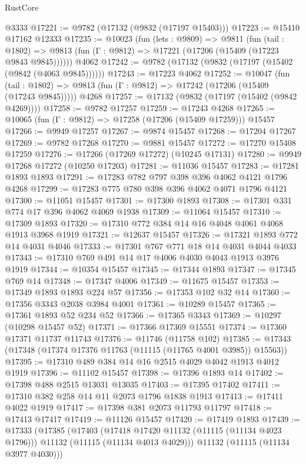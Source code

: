 \begin{lexlean}{RustCore}
\begin{coremodule}
    @3333
@17221 := @9782 (@17132 (@9832 (@17197 @15403)))
@17223 := @15410 @17162 @12333
@17235 := @10023
    (fun (lets : @9809) =>
    @9811
      (fun (tail : @1802) =>
      @9813 (fun (Γ : @9812) => @17221 (@17206 (@15409 (@17223 @9843 @9845))))))
    @4062
@17242 := @9782 (@17132 (@9832 (@17197 (@15402 (@9842 (@4063 @9845))))))
@17243 := @17223 @4062
@17252 := @10047
    (fun (tail : @1802) => @9813 (fun (Γ : @9812) => @17242 (@17206 (@15409 (@17243 @9845)))))
    @4268
@17257 := @17132 (@9832 (@17197 (@15402 (@9842 @4269))))
@17258 := @9782 @17257
@17259 := @17243 @4268
@17265 := @10065 (fun (Γ : @9812) => @17258 (@17206 (@15409 @17259))) @15457
@17266 := @9949 @17257
@17267 := @9874 @15457
@17268 := @17204 @17267
@17269 := @9782 @17268
@17270 := @9881 @15457
@17272 := @17270 @15408 @17259
@17276 := @17266 (@17269 @17272) (@10245 @17131)
@17280 := @9949 @17268 @17272 (@10250 @17203)
@17281 := @11036 @15457
@17283 := @17281 @1893 @1893
@17291 := @17283 @782 @797 @398 @396 @4062 @4121 @1796 @4268
@17299 := @17283 @775 @780 @398 @396 @4062 @4071 @1796 @4121
@17300 := @11051 @15457
@17301 := @17300 @1893
@17308 := @17301 @331 @774 @17 @396 @4062 @4069 @1938
@17309 := @11064 @15457
@17310 := @17309 @1893
@17320 := @17310 @772 @384 @14 @16 @4048 @4061 @4068 @1913 @3968 @1919
@17321 := @12637 @15457
@17326 := @17321 @1893 @772 @14 @4031 @4046
@17333 := @17301 @767 @771 @18 @14 @4031 @4044 @4033
@17343 := @17310 @769 @491 @14 @17 @4006 @4030 @4043 @1913 @3976 @1919
@17344 := @10354 @15457
@17345 := @17344 @1893
@17347 := @17345 @769 @14
@17348 := @17347 @4006
@17349 := @11675 @15457
@17353 := @17349 @1893 @1893 @224 @57
@17356 := @17353 @102 @32 @14
@17360 := @17356 @3343 @2038 @3984 @4001
@17361 := @10289 @15457
@17365 := @17361 @1893 @52 @234 @52
@17366 := @17365 @3343
@17369 := @10297 (@10298 @15457 @52)
@17371 := @17366 @17369 @15551
@17374 := @17360 @17371 @11737 @11743
@17376 := @11746 (@11758 @102)
@17385 := @17343 (@17348 (@17374 @17376 @11763 (@11115 (@11765 @4001 @3985)) @15563))
@17395 := @17310 @489 @384 @14 @16 @2515 @4029 @4042 @1913 @4012 @1919
@17396 := @11102 @15457
@17398 := @17396 @1893 @14
@17402 := @17398 @488 @2515 @13031 @13035
@17403 := @17395 @17402
@17411 := @17310 @382 @258 @14 @11 @2073 @1796 @1838 @1913
@17413 := @17411 @4022 @1919
@17417 := @17398 @381 @2073 @11793 @11797
@17418 := @17413 @17417
@17419 := @11126 @15457
@17420 := @17419 @1893
@17439 := @17333
    (@17385
      (@17403
        (@17418 @17420 @11132 (@11115 (@11134 @4023 @1796)))
        @11132
        (@11115 (@11134 @4013 @4029)))
      @11132
      (@11115 (@11134 @3977 @4030)))

\end{coremodule}
\end{lexlean}
